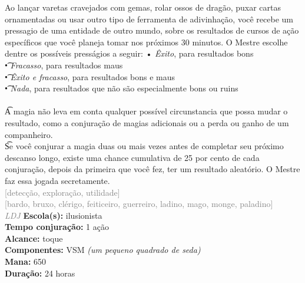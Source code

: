 \documentclass{RPG_Adventure}[2021/10/20]
\begin{document}
{\normalsize Ao lançar varetas cravejados com gemas, rolar ossos de dragão, puxar cartas ornamentadas ou usar outro tipo de ferramenta de adivinhação, você recebe um pressagio de uma entidade de outro mundo, sobre os resultados de cursos de ação específicos que você planeja tomar nos próximos 30 minutos. O Mestre escolhe dentre os possíveis presságios a seguir: • \textit{Êxito}, para resultados bons\\\t • \textit{Fracasso}, para resultados maus\\\t • \textit{Êxito e fracasso}, para resultados bons e maus\\\t • \textit{Nada}, para resultados que não são especialmente bons ou ruins\\\\\t A magia não leva em conta qualquer possível circunstancia que possa mudar o resultado, como a conjuração de magias adicionais ou a perda ou ganho de um companheiro.\\\t Se você conjurar a magia duas ou mais vezes antes de completar seu próximo descanso longo, existe uma chance cumulativa de 25 por cento de cada conjuração, depois da primeira que você fez, ter um resultado aleatório. O Mestre faz essa jogada secretamente.\\}
{\scriptsize \textcolor{gray}{[detecção, exploração, utilidade]\\}}
{\scriptsize \textcolor{gray}{[bardo, bruxo, clérigo, feiticeiro, guerreiro, ladino, mago, monge, paladino]\\}}
{\tiny \textcolor{gray}{\textit{LDJ}}}
{\small \t \textbf{Escola(s):} ilusionista\\\t \textbf{Tempo conjuração:} 1 ação\\\t \textbf{Alcance:} toque\\\t \textbf{Componentes:} VSM \textit{(um pequeno quadrado de seda)}\\\t \textbf{Mana:} 650\\\t \textbf{Duração:} 24 horas\\}
\end{document}
